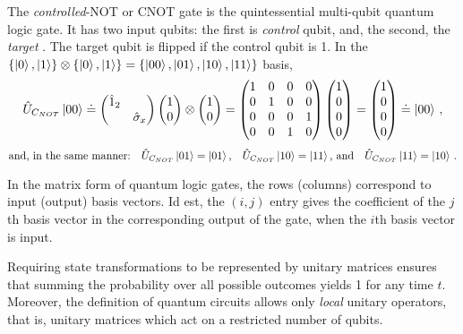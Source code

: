 \documentclass[11pt]{article}
\numberwithin{equation}{section} %
\numberwithin{figure}{section} %
\begin{document}
\begin{appendices}
The \emph{controlled}-NOT or CNOT gate is the quintessential multi-qubit quantum logic gate. It has two input qubits: the first is \emph{control} qubit, and, the second, the \emph{target} \cite[p.~20, l.~28-29]{Nielsen}. The target qubit is flipped if the control qubit is 1. In the $\{\ket{0},\ket{1}\}\otimes\{\ket{0},\ket{1}\}=\{\ket{00},\ket{01},\ket{10},\ket{11}\}$ basis,
$$\hat{U}_{C_{NOT}}\ket{00}\doteq \begin{pmatrix} \hat{1}_2 & \\ &\hat{\sigma}_x \end{pmatrix}\begin{pmatrix} 1\\0\end{pmatrix}\otimes\begin{pmatrix} 1\\0\end{pmatrix} =
\begin{pmatrix}1&0&0&0\\0&1&0&0\\0&0&0&1\\0&0&1&0\end{pmatrix}\begin{pmatrix}1\\0\\0\\0\end{pmatrix}=\begin{pmatrix}1\\0\\0\\0\end{pmatrix}\doteq\ket{00}\,\textrm{,}$$
$$\textrm{and, in the same manner:}\quad\hat{U}_{C_{NOT}}\ket{01}=\ket{01}\textrm{,}\quad\hat{U}_{C_{NOT}}\ket{10}=\ket{11}\textrm{, and}\quad\hat{U}_{C_{NOT}}\ket{11}=\ket{10}\,\textrm{.}$$

In the matrix form of quantum logic gates, the rows (columns) correspond to input (output) basis vectors. Id est, the $(i,j)$ entry gives the coefficient of the $j$th basis vector in the corresponding output of the gate, when the $i$th basis vector is input.

Requiring state transformations to be represented by unitary matrices ensures that summing the probability over all possible outcomes yields 1 for any time $t$. Moreover, the definition of quantum circuits allows only \emph{local} unitary operators, that is, unitary matrices which act on a restricted number of qubits. \cite[p.~6, l.~11-12]{Shor} \cite[p.~88, l.~1]{Deutsch}


\end{appendices}
\end{document}
